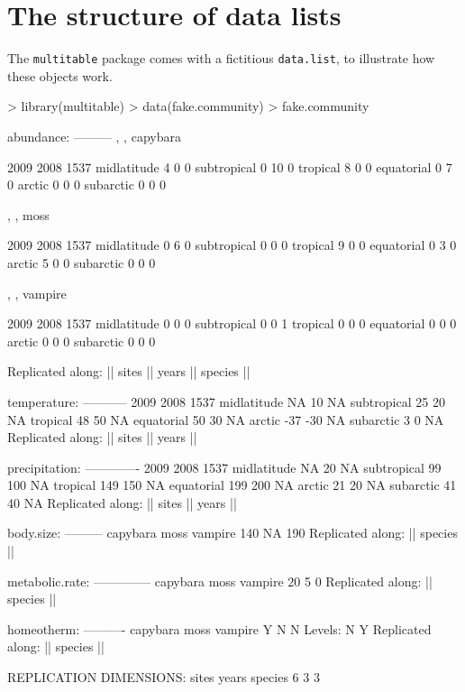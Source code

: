 \documentclass{article}
\newcommand{\code}[1]{\texttt{#1}}
\numberwithin{exercise}{section}
\begin{document}
\section{The structure of data lists}

The \code{multitable} package comes with a fictitious \code{data.list}, to illustrate how these objects work.
\begin{Schunk}
\begin{Sinput}
> library(multitable)
> data(fake.community)
> fake.community
\end{Sinput}
\begin{Soutput}
abundance:
---------
, , capybara

            2009 2008 1537
midlatitude    4    0    0
subtropical    0   10    0
tropical       8    0    0
equatorial     0    7    0
arctic         0    0    0
subarctic      0    0    0

, , moss

            2009 2008 1537
midlatitude    0    6    0
subtropical    0    0    0
tropical       9    0    0
equatorial     0    3    0
arctic         5    0    0
subarctic      0    0    0

, , vampire

            2009 2008 1537
midlatitude    0    0    0
subtropical    0    0    1
tropical       0    0    0
equatorial     0    0    0
arctic         0    0    0
subarctic      0    0    0

Replicated along:  || sites || years || species || 


temperature:
-----------
            2009 2008 1537
midlatitude   NA   10   NA
subtropical   25   20   NA
tropical      48   50   NA
equatorial    50   30   NA
arctic       -37  -30   NA
subarctic      3    0   NA
Replicated along:  || sites || years || 


precipitation:
-------------
            2009 2008 1537
midlatitude   NA   20   NA
subtropical   99  100   NA
tropical     149  150   NA
equatorial   199  200   NA
arctic        21   20   NA
subarctic     41   40   NA
Replicated along:  || sites || years || 


body.size:
---------
capybara     moss  vampire 
     140       NA      190 
Replicated along:  || species || 


metabolic.rate:
--------------
capybara     moss  vampire 
      20        5        0 
Replicated along:  || species || 


homeotherm:
----------
capybara     moss  vampire 
       Y        N        N 
Levels: N Y
Replicated along:  || species || 


REPLICATION DIMENSIONS: 
  sites   years species 
      6       3       3 
\end{Soutput}
\end{Schunk}
\end{document}
